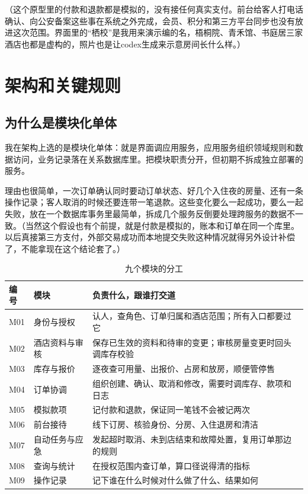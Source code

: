 \documentclass[UTF8,a4paper,zihao=-4,fontset=none]{ctexart}
\begin{document}
（这个原型里的付款和退款都是模拟的，没有接任何真实支付。前台给客人打电话确认、向公安备案这些事在系统之外完成，会员、积分和第三方平台同步也没有放进这次范围。界面里的“栖校”是我用来演示编的名，梧桐院、青禾馆、书庭居三家酒店也都是虚构的，照片也是让codex生成来示意房间长什么样。）

\section{架构和关键规则}
\subsection{为什么是模块化单体}
我在架构上选的是模块化单体：就是界面调应用服务，应用服务组织领域规则和数据访问，业务记录落在关系数据库里。把模块职责分开，但初期不拆成独立部署的服务。

理由也很简单，一次订单确认同时要动订单状态、好几个入住夜的房量、还有一条操作记录；客人取消的时候还要连带一笔退款。这些变化要么一起成功，要么一起失败，放在一个数据库事务里最简单，拆成几个服务反倒要处理跨服务的数据不一致。（当然这个假设也有个前提，就是付款是模拟的，账本和订单在同一个库里。以后真接第三方支付，外部交易成功而本地提交失败这种情况就得另外设计补偿了，不能拿现在这个结论套了。）

\begin{table}[H]\centering\small
\caption{九个模块的分工}
\begin{tabularx}{\linewidth}{p{9mm}p{30mm}Y}\toprule
编号&模块&负责什么，跟谁打交道\\\midrule
M01&身份与授权&认人，查角色、订单归属和酒店范围；所有入口都要过它\\
M02&酒店资料与审核&保存已生效的资料和待审的变更；审核房量变更时回头调库存校验\\
M03&库存与报价&逐夜查可用量、出报价、占房和放房，顺便管停售\\
M04&订单协调&组织创建、确认、取消和修改，需要时调库存、款项和日志\\
M05&模拟款项&记付款和退款，保证同一笔钱不会被记两次\\
M06&前台接待&线下订房、核验身份、分房、入住退房和清洁\\
M07&自动任务与应急&发起超时取消、未到店结束和故障处置，复用订单那边的规则\\
M08&查询与统计&在授权范围内查订单，算口径说得清的指标\\
M09&操作记录&记下谁在什么时候对什么做了什么、结果如何\\\bottomrule
\end{tabularx}\end{table}
\end{document}
